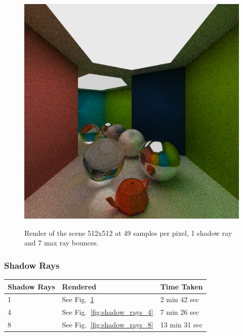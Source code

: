 \documentclass[a4paper, twocolumn]{article}
\begin{document}
            \begin{figure}[H]
                \centering
                \caption{Render of the scene 512x512 at 49 samples per pixel, 1 shadow ray and 7 max ray bounces.}
                \includegraphics[width=0.8\linewidth]{share/results/default.png}
                \label{fig:default}
            \end{figure}

            \subsubsection*{Shadow Rays}

            \begin{table}[H]
            \centering
            \begin{tabular}{lll}
                \toprule
                \textbf{Shadow Rays}&\textbf{Rendered}&\textbf{Time Taken}\\
                \midrule
                1&See Fig.~\ref{fig:default}&2 min 42 sec\\
                4&See Fig.~\ref{fig:shadow_rays_4}&7 min 26 sec\\
                8&See Fig.~\ref{fig:shadow_rays_8}&13 min 31 sec\\
                \bottomrule
            \end{tabular}
            \label{tab:shadow_rays}
            \end{table}
\end{document}
